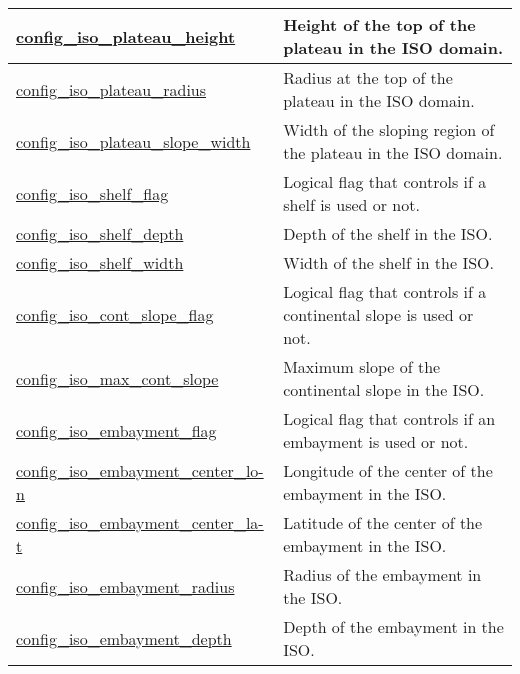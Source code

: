 {\begin{center}
\begin{longtable}{| p{2.0in} || p{4.0in} |}
    \hline
    \hyperref[subsec:nm_sec_config_iso_plateau_height]{config\_iso\_plateau\_height} & Height of the top of the plateau in the ISO domain. \\
    \hline
    \hyperref[subsec:nm_sec_config_iso_plateau_radius]{config\_iso\_plateau\_radius} & Radius at the top of the plateau in the ISO domain. \\
    \hline
    \hyperref[subsec:nm_sec_config_iso_plateau_slope_width]{config\_iso\_plateau\_slope\_width} & Width of the sloping region of the plateau in the ISO domain. \\
    \hline
    \hyperref[subsec:nm_sec_config_iso_shelf_flag]{config\_iso\_shelf\_flag} & Logical flag that controls if a shelf is used or not. \\
    \hline
    \hyperref[subsec:nm_sec_config_iso_shelf_depth]{config\_iso\_shelf\_depth} & Depth of the shelf in the ISO. \\
    \hline
    \hyperref[subsec:nm_sec_config_iso_shelf_width]{config\_iso\_shelf\_width} & Width of the shelf in the ISO. \\
    \hline
    \hyperref[subsec:nm_sec_config_iso_cont_slope_flag]{config\_iso\_cont\_slope\_flag} & Logical flag that controls if a continental slope is used or not. \\
    \hline
    \hyperref[subsec:nm_sec_config_iso_max_cont_slope]{config\_iso\_max\_cont\_slope} & Maximum slope of the continental slope in the ISO. \\
    \hline
    \hyperref[subsec:nm_sec_config_iso_embayment_flag]{config\_iso\_embayment\_flag} & Logical flag that controls if an embayment is used or not. \\
    \hline
    \hyperref[subsec:nm_sec_config_iso_embayment_center_lon]{config\_iso\_embayment\_center\_lo-}\hyperref[subsec:nm_sec_config_iso_embayment_center_lon]{n}& Longitude of the center of the embayment in the ISO. \\
    \hline
    \hyperref[subsec:nm_sec_config_iso_embayment_center_lat]{config\_iso\_embayment\_center\_la-}\hyperref[subsec:nm_sec_config_iso_embayment_center_lat]{t}& Latitude of the center of the embayment in the ISO. \\
    \hline
    \hyperref[subsec:nm_sec_config_iso_embayment_radius]{config\_iso\_embayment\_radius} & Radius of the embayment in the ISO. \\
    \hline
    \hyperref[subsec:nm_sec_config_iso_embayment_depth]{config\_iso\_embayment\_depth} & Depth of the embayment in the ISO. \\

\end{longtable}
\end{center}}
